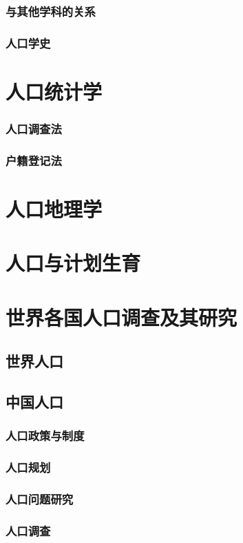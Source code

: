 \documentclass[UTF8]{../RepresentationUniverse}
\begin{document}
    \subsubsection{与其他学科的关系}
    \subsubsection{人口学史}
\section{人口统计学}
    \subsubsection{人口调查法}
    \subsubsection{户籍登记法}
\section{人口地理学}
\section{人口与计划生育}
\section{世界各国人口调查及其研究}
    \subsection{世界人口}
    \subsection{中国人口}
        \subsubsection{人口政策与制度}
        \subsubsection{人口规划}
        \subsubsection{人口问题研究}
        \subsubsection{人口调查}
\end{document}
